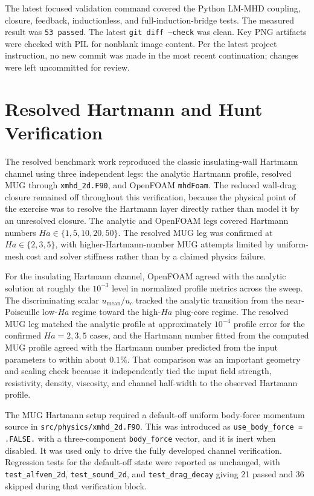 \documentclass[11pt]{article}
\begin{document}
The latest focused validation command covered the Python LM-MHD coupling, closure, feedback, inductionless, and full-induction-bridge tests. The measured result was \texttt{53 passed}. The latest \texttt{git diff --check} was clean. Key PNG artifacts were checked with PIL for nonblank image content. Per the latest project instruction, no new commit was made in the most recent continuation; changes were left uncommitted for review.

\section{Resolved Hartmann and Hunt Verification}

The resolved benchmark work reproduced the classic insulating-wall Hartmann channel using three independent legs: the analytic Hartmann profile, resolved MUG through \texttt{xmhd\_2d.F90}, and OpenFOAM \texttt{mhdFoam}. The reduced wall-drag closure remained off throughout this verification, because the physical point of the exercise was to resolve the Hartmann layer directly rather than model it by an unresolved closure. The analytic and OpenFOAM legs covered Hartmann numbers \(Ha \in \{1,5,10,20,50\}\). The resolved MUG leg was confirmed at \(Ha \in \{2,3,5\}\), with higher-Hartmann-number MUG attempts limited by uniform-mesh cost and solver stiffness rather than by a claimed physics failure.

For the insulating Hartmann channel, OpenFOAM agreed with the analytic solution at roughly the \(10^{-3}\) level in normalized profile metrics across the sweep. The discriminating scalar \(u_{\mathrm{mean}}/u_c\) tracked the analytic transition from the near-Poiseuille low-\(Ha\) regime toward the high-\(Ha\) plug-core regime. The resolved MUG leg matched the analytic profile at approximately \(10^{-4}\) profile error for the confirmed \(Ha=2,3,5\) cases, and the Hartmann number fitted from the computed MUG profile agreed with the Hartmann number predicted from the input parameters to within about \(0.1\%\). That comparison was an important geometry and scaling check because it independently tied the input field strength, resistivity, density, viscosity, and channel half-width to the observed Hartmann profile.

The MUG Hartmann setup required a default-off uniform body-force momentum source in \texttt{src/physics/xmhd\_2d.F90}. This was introduced as \texttt{use\_body\_force = .FALSE.} with a three-component \texttt{body\_force} vector, and it is inert when disabled. It was used only to drive the fully developed channel verification. Regression tests for the default-off state were reported as unchanged, with \texttt{test\_alfven\_2d}, \texttt{test\_sound\_2d}, and \texttt{test\_drag\_decay} giving 21 passed and 36 skipped during that verification block.
\end{document}
